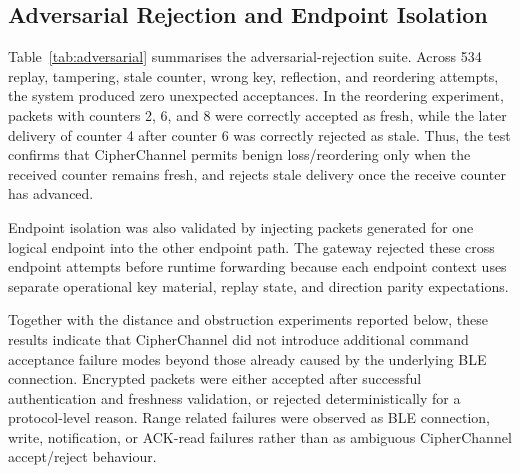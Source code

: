 \documentclass[journal]{IEEEtran}
\begin{document}
\subsection{Adversarial Rejection and Endpoint Isolation}

Table~\ref{tab:adversarial} summarises the adversarial-rejection suite. Across 534 replay, tampering, stale counter, wrong key, reflection, and reordering attempts, the system produced zero unexpected acceptances. In the reordering experiment, packets with counters 2, 6, and 8 were correctly accepted as fresh, while the later delivery of counter 4 after counter 6 was correctly rejected as stale. Thus, the test confirms that CipherChannel permits benign loss/reordering only when the received counter remains fresh, and rejects stale delivery once the receive counter has advanced.

Endpoint isolation was also validated by injecting packets generated for one logical endpoint into the other endpoint path. The gateway rejected these cross endpoint attempts before runtime forwarding because each endpoint context uses separate operational key material, replay state, and direction parity expectations.

Together with the distance and obstruction experiments reported below, these results indicate that CipherChannel did not introduce additional command acceptance failure modes beyond those already caused by the underlying BLE connection. Encrypted packets were either accepted after successful authentication and freshness validation, or rejected deterministically for a protocol-level reason. Range related failures were observed as BLE connection, write, notification, or ACK-read failures rather than as ambiguous CipherChannel accept/reject behaviour.
\end{document}
